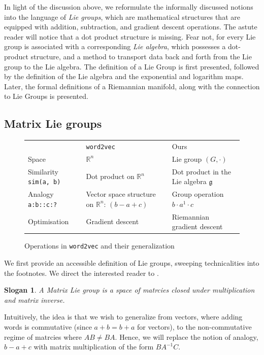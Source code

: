 \documentclass[11pt]{book}
\newtheorem{slogan}{Slogan}
\begin{document}
In light of the discussion above, we reformulate the informally discussed
notions into the language of \emph{Lie groups}, which are mathematical structures
that are equipped with addition, subtraction, and gradient descent operations.
The astute reader will notice that a dot product structure is missing. Fear not, for
every Lie group is associated with a corresponding \emph{Lie algebra}, which possesses
a dot-product structure, and a method to transport data back and forth from the Lie group
to the Lie algebra. The definition of a Lie Group is first presented, followed by
the definition of the Lie algebra and the exponential and logarithm maps. Later, the
formal definitions of a Riemannian manifold, along with the connection to Lie
Groups is presented.

\subsection{Matrix Lie groups}

\begin{figure}
\label{fig:table-structures-word2vec-vs-ours}
\begin{tabular}{lll}
& \texttt{word2vec} & Ours \\
Space & $\mathbb R^n$ & Lie group $(G, \cdot)$ \\
Similarity \texttt{sim(a, b)}&  Dot product on $\mathbb R^n$ & Dot product in the Lie algebra $\mathfrak g$ \\
Analogy \texttt{a:b::c:?} & Vector space structure on $\mathbb R^n$: $(b - a + c)$ & Group operation $b\cdot a^{1}\cdot c$ \\
Optimisation & Gradient descent & Riemannian gradient descent 
\end{tabular}
\caption{Operations in \texttt{word2vec} and their generalization}
\end{figure}

We first provide an accessible definition of Lie groups, sweeping
technicalities into the footnotes. We direct the interested reader to \cite{hall2015lie}.

\begin{slogan}
A Matrix Lie group is a space of matrcies closed under multiplication and
matrix inverse.
\end{slogan}

Intuitively, the idea is that we wish to generalize from vectors, where adding
words is commutative (since $a + b = b + a$ for vectors), to the non-commutative
regime of matrcies where $AB \neq BA$. Hence, we will replace the notion of analogy,
$b - a + c$ with matrix multiplication of the form $BA^{-1}C$.
\end{document}
